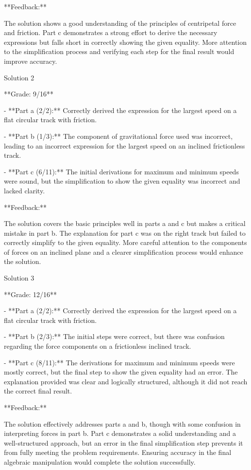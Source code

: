 \documentclass[a4paper,11pt]{article}
\begin{document}
**Feedback:**

The solution shows a good understanding of the principles of centripetal force and friction. Part c demonstrates a strong effort to derive the necessary expressions but falls short in correctly showing the given equality. More attention to the simplification process and verifying each step for the final result would improve accuracy.

Solution 2

**Grade: 9/16**

- **Part a (2/2):** Correctly derived the expression for the largest speed on a flat circular track with friction.

- **Part b (1/3):** The component of gravitational force used was incorrect, leading to an incorrect expression for the largest speed on an inclined frictionless track.

- **Part c (6/11):** The initial derivations for maximum and minimum speeds were sound, but the simplification to show the given equality was incorrect and lacked clarity.

**Feedback:**

The solution covers the basic principles well in parts a and c but makes a critical mistake in part b. The explanation for part c was on the right track but failed to correctly simplify to the given equality. More careful attention to the components of forces on an inclined plane and a clearer simplification process would enhance the solution.

Solution 3

**Grade: 12/16**

- **Part a (2/2):** Correctly derived the expression for the largest speed on a flat circular track with friction.

- **Part b (2/3):** The initial steps were correct, but there was confusion regarding the force components on a frictionless inclined track.

- **Part c (8/11):** The derivations for maximum and minimum speeds were mostly correct, but the final step to show the given equality had an error. The explanation provided was clear and logically structured, although it did not reach the correct final result.

**Feedback:**

The solution effectively addresses parts a and b, though with some confusion in interpreting forces in part b. Part c demonstrates a solid understanding and a well-structured approach, but an error in the final simplification step prevents it from fully meeting the problem requirements. Ensuring accuracy in the final algebraic manipulation would complete the solution successfully.
\end{document}
